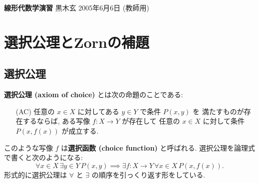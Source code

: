 \documentclass[12pt,twoside]{jarticle}
\newcommand\commentout[1]{#1}
\newcommand\commentout[1]{}
\begin{document}

%
%



\noindent
{\Large\bf 線形代数学演習}
\hfill
{\large 黒木玄}
\qquad
2005年6月6日
\commentout{\quad (教師用)}


\tableofcontents


\section{選択公理とZornの補題}




\subsection{選択公理}

{\bf 選択公理 (axiom of choice)} とは次の命題のことである:
\begin{itemize}
\item[(AC)] 任意の $x\in X$ に対してある $y\in Y$ で条件 $P(x,y)$ を
  満たすものが存在するならば, 
  ある写像 $f:X\to Y$ が存在して
  任意の $x\in X$ に対して条件 $P(x,f(x))$ が成立する.
\end{itemize}
このような写像 $f$ は{\bf 選択函数 (choice function)} と呼ばれる.
選択公理を論理式で書くと次のようになる:
\begin{equation*}
  \forall x\in X\, \exists y\in Y\, P(x,y)
  \implies
  \exists f:X\to Y\, \forall x\in X\, P(x,f(x)).
\end{equation*}
形式的に選択公理は $\forall$ と $\exists$ の順序を引っくり返す形をしている.
\end{document}
